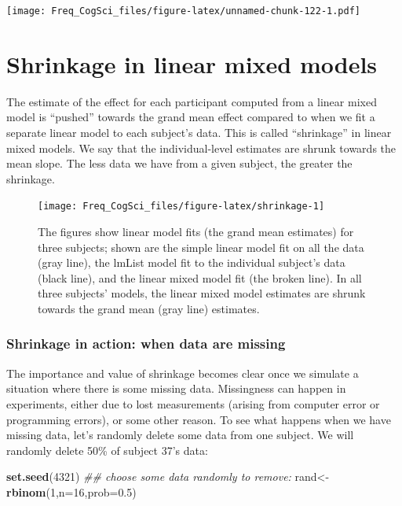 \documentclass[12pt,]{krantz}
\newenvironment{Shaded}{\begin{snugshade}}{\end{snugshade}}
\newcommand{\CommentTok}[1]{\textcolor[rgb]{0.56,0.35,0.01}{\textit{#1}}}
\newcommand{\DataTypeTok}[1]{\textcolor[rgb]{0.13,0.29,0.53}{#1}}
\newcommand{\DecValTok}[1]{\textcolor[rgb]{0.00,0.00,0.81}{#1}}
\newcommand{\FloatTok}[1]{\textcolor[rgb]{0.00,0.00,0.81}{#1}}
\newcommand{\KeywordTok}[1]{\textcolor[rgb]{0.13,0.29,0.53}{\textbf{#1}}}
\newcommand{\NormalTok}[1]{#1}
\begin{document}
\texttt{[image: Freq\_CogSci\_files/figure-latex/unnamed-chunk-122-1.pdf]}

\hypertarget{shrinkage-in-linear-mixed-models}{%
\section{Shrinkage in linear mixed models}\label{shrinkage-in-linear-mixed-models}}

The estimate of the effect for each participant computed from a linear mixed model is ``pushed'' towards the grand mean effect compared to when we fit a separate linear model to each subject's data.
This is called ``shrinkage'' in linear mixed models. We say that the individual-level estimates are shrunk towards the mean slope.
The less data we have from a given subject, the greater the shrinkage.

\begin{figure}
\texttt{[image: Freq\_CogSci\_files/figure-latex/shrinkage-1]} \caption{The figures show linear model fits (the grand mean estimates) for three subjects; shown are the simple linear model fit on all the data (gray line), the lmList model fit to the individual subject's data (black line), and the linear mixed model fit (the broken line). In all three subjects' models, the linear mixed model estimates are shrunk towards the grand mean (gray line) estimates.}\label{fig:shrinkage}
\end{figure}

\hypertarget{shrinkage-in-action-when-data-are-missing}{%
\subsubsection{Shrinkage in action: when data are missing}\label{shrinkage-in-action-when-data-are-missing}}

The importance and value of shrinkage becomes clear once we simulate a situation where there is some missing data. Missingness can happen in experiments, either due to lost measurements (arising from computer error or programming errors), or some other reason. To see what happens when we have missing data, let's randomly delete some data from one subject. We will randomly delete 50\% of subject 37's data:

\begin{Shaded}
\begin{Highlighting}[]
\KeywordTok{set.seed}\NormalTok{(}\DecValTok{4321}\NormalTok{)}
\CommentTok{## choose some data randomly to remove:}
\NormalTok{rand<-}\KeywordTok{rbinom}\NormalTok{(}\DecValTok{1}\NormalTok{,}\DataTypeTok{n=}\DecValTok{16}\NormalTok{,}\DataTypeTok{prob=}\FloatTok{0.5}\NormalTok{)}
\end{Highlighting}
\end{Shaded}
\end{document}
